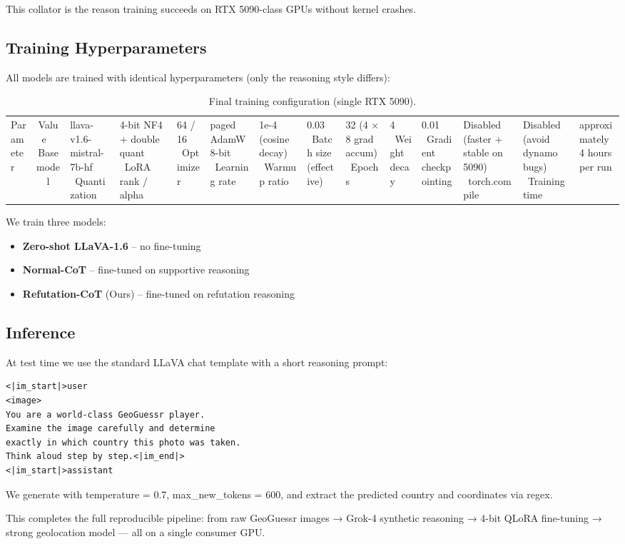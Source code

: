 \documentclass[11pt,a4paper]{article}
\begin{document}
This collator is the reason training succeeds on RTX 5090-class GPUs without kernel crashes.
\subsection{Training Hyperparameters}
All models are trained with identical hyperparameters (only the reasoning style differs):
\begin{table}[H]
\centering
\caption{Final training configuration (single RTX 5090).}
\label{tab:hyperparams}
\begin{tabular}{lc}
\toprule
Parameter & Value \
\midrule
Base model & llava-v1.6-mistral-7b-hf \
Quantization & 4-bit NF4 + double quant \
LoRA rank / alpha & 64 / 16 \
Optimizer & paged AdamW 8-bit \
Learning rate & 1e-4 (cosine decay) \
Warmup ratio & 0.03 \
Batch size (effective) & 32 (4 × 8 grad accum) \
Epochs & 4 \
Weight decay & 0.01 \
Gradient checkpointing & Disabled (faster + stable on 5090) \
torch.compile & Disabled (avoid dynamo bugs) \
Training time & approximately 4 hours per run \
\bottomrule
\end{tabular}
\end{table}
We train three models:
\begin{itemize}
\item \textbf{Zero-shot LLaVA-1.6} – no fine-tuning
\item \textbf{Normal-CoT} – fine-tuned on supportive reasoning
\item \textbf{Refutation-CoT} (Ours) – fine-tuned on refutation reasoning
\end{itemize}
\subsection{Inference}
At test time we use the standard LLaVA chat template with a short reasoning prompt:
\begin{verbatim}
<|im_start|>user
<image>
You are a world-class GeoGuessr player.
Examine the image carefully and determine
exactly in which country this photo was taken.
Think aloud step by step.<|im_end|>
<|im_start|>assistant
\end{verbatim}
We generate with temperature = 0.7, max_new_tokens = 600, and extract the predicted country and coordinates via regex.

This completes the full reproducible pipeline: from raw GeoGuessr images → Grok-4 synthetic reasoning → 4-bit QLoRA fine-tuning → strong geolocation model — all on a single consumer GPU.
\end{document}
